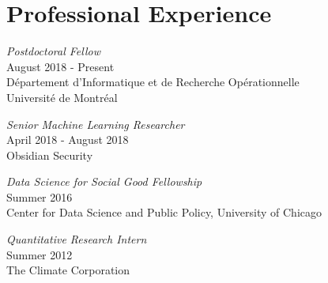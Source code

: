 \documentclass[letterpaper]{article}
\renewenvironment{itemize}{
  \begin{list}{}{
    \setlength{\leftmargin}{1.5em}
  }
}{
  \end{list}
}
\begin{document}
\section*{Professional Experience}
\begin{itemize}
\item \textit{Postdoctoral Fellow}\\
August 2018 - Present \\
D\'epartement d'Informatique et de Recherche Op\'erationnelle \\
Universit\'e de Montr\'eal

\item \textit{Senior Machine Learning Researcher} \\
  April 2018 - August 2018 \\
  Obsidian Security
\item \textit{Data Science for Social Good Fellowship} \\
  Summer 2016 \\
  Center for Data Science and Public Policy, University of Chicago
\item \textit{Quantitative Research Intern} \\
  Summer 2012 \\
  The Climate Corporation
\end{itemize}
\end{document}
